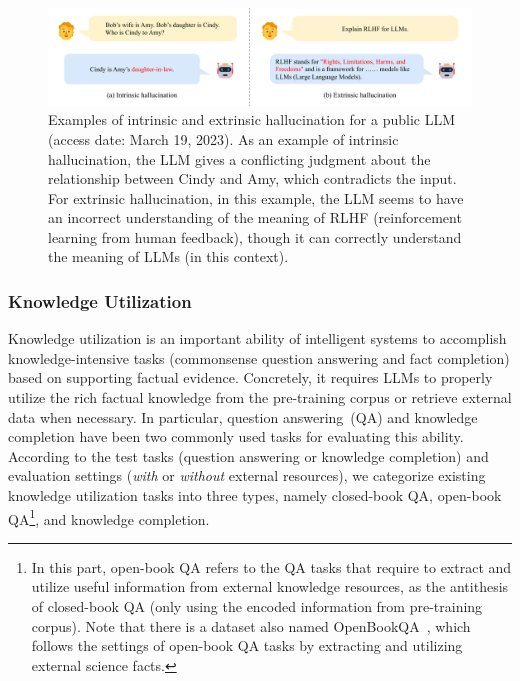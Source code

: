 \begin{figure}[h]
    \centering
        \includegraphics[width=1\textwidth]{images/hallucination.pdf}
    \caption{Examples of intrinsic and extrinsic hallucination for a public LLM (access date: March 19, 2023). As an example of intrinsic hallucination, the LLM gives a conflicting judgment about the relationship between Cindy and Amy, which  contradicts the input. 
{For extrinsic hallucination, in this example, the LLM seems to have an incorrect understanding of the meaning of RLHF (reinforcement learning from human feedback), though it can correctly understand the meaning of LLMs (in this context). } }
    \label{fig:hallucination}
\end{figure}

\subsubsection{Knowledge Utilization}

Knowledge utilization is an important ability of intelligent systems to accomplish knowledge-intensive tasks (\eg commonsense question answering and fact completion) based on supporting factual evidence. 
Concretely, it requires LLMs to {properly utilize the rich factual knowledge from the pre-training corpus or retrieve external data when necessary.} 
In particular, question answering~(QA) and knowledge completion have been two commonly used tasks for evaluating this ability. 
According to the test tasks (question answering or knowledge completion) and evaluation settings (\emph{with} or \emph{without} external resources), we categorize existing knowledge utilization tasks into three types, namely closed-book QA, open-book QA\footnote{In this part, open-book QA refers to the QA tasks that require to extract and utilize useful information from external knowledge resources, as the antithesis of closed-book QA (only using the encoded information from  pre-training corpus). Note that there is a dataset  also named OpenBookQA~\cite{Mihaylov-EMNLP-2018-Can}, which  follows the settings of open-book QA tasks by extracting and utilizing  external science facts.}, and knowledge completion.



